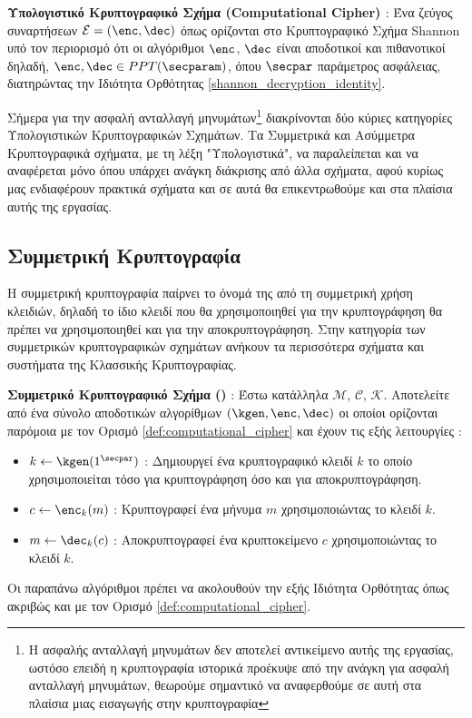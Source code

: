 \begin{definition}
\label{def:computational_cipher}
\textbf{Υπολογιστικό Κρυπτογραφικό Σχήμα (Computational Cipher) \cite{boneh2020graduate}} : Ένα ζεύγος συναρτήσεων $\mathcal{E} = (\enc, \dec)$ όπως ορίζονται στο Κρυπτογραφικό Σχήμα Shannon υπό τον περιορισμό ότι οι αλγόριθμοι $\enc$, $\dec$ είναι αποδοτικοί και πιθανοτικοί δηλαδή, $\enc, \dec \in PPT(\secparam)$, όπου $\secpar$ παράμετρος ασφάλειας, διατηρώντας την Ιδιότητα Ορθότητας \ref{shannon_decryption_identity}.
\end{definition}

Σήμερα για την ασφαλή ανταλλαγή μηνυμάτων\footnote{Η ασφαλής ανταλλαγή μηνυμάτων δεν αποτελεί αντικείμενο αυτής της εργασίας, ωστόσο επειδή η κρυπτογραφία ιστορικά προέκυψε από την ανάγκη για ασφαλή ανταλλαγή μηνυμάτων, θεωρούμε σημαντικό να αναφερθούμε σε αυτή στα πλαίσια μιας εισαγωγής στην κρυπτογραφία} διακρίνονται δύο κύριες κατηγορίες Υπολογιστικών Κρυπτογραφικών Σχημάτων. Τα Συμμετρικά και Ασύμμετρα Κρυπτογραφικά σχήματα, με τη λέξη "Υπολογιστικά", να παραλείπεται και να αναφέρεται μόνο όπου υπάρχει ανάγκη διάκρισης από άλλα σχήματα, αφού κυρίως μας ενδιαφέρουν πρακτικά σχήματα και σε αυτά θα επικεντρωθούμε και στα πλαίσια αυτής της εργασίας.

\subsection{Συμμετρική Κρυπτογραφία}

Η συμμετρική κρυπτογραφία παίρνει το όνομά της από τη συμμετρική χρήση κλειδιών, δηλαδή το ίδιο κλειδί που θα χρησιμοποιηθεί για την κρυπτογράφηση θα πρέπει να χρησιμοποιηθεί και για την αποκρυπτογράφηση. Στην κατηγορία των συμμετρικών κρυπτογραφικών σχημάτων ανήκουν τα περισσότερα σχήματα και συστήματα της Κλασσικής Κρυπτογραφίας.

\begin{definition}
\label{def:symetric_cryptographic_scheme}
\textbf{Συμμετρικό Κρυπτογραφικό Σχήμα ()} : Έστω κατάλληλα $\mathcal{M}$, $\mathcal{C}$, $\mathcal{K}$. Αποτελείτε από ένα σύνολο αποδοτικών αλγορίθμων $(\kgen, \enc, \dec)$ οι οποίοι ορίζονται παρόμοια με τον Ορισμό \ref{def:computational_cipher} και έχουν τις εξής λειτουργίες :
\begin{itemize}
    \item $k \leftarrow \kgen(1^\secpar)$ : Δημιουργεί ένα κρυπτογραφικό κλειδί $k$ το οποίο χρησιμοποιείται τόσο για κρυπτογράφηση όσο και για αποκρυπτογράφηση.
    \item $c \leftarrow \enc_{k}(m)$ : Κρυπτογραφεί ένα μήνυμα $m$ χρησιμοποιώντας το κλειδί $k$.
    \item $m \leftarrow \dec_{k}(c)$ : Αποκρυπτογραφεί ένα κρυπτοκείμενο $c$ χρησιμοποιώντας το κλειδί $k$.
\end{itemize}
Οι παραπάνω αλγόριθμοι πρέπει να ακολουθούν την εξής Ιδιότητα Ορθότητας όπως ακριβώς και με τον Ορισμό \ref{def:computational_cipher}.
\end{definition}

